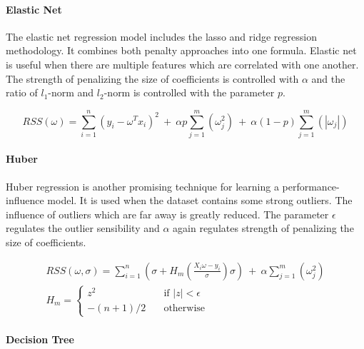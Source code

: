 \paragraph{Elastic Net}

The elastic net regression model includes the lasso and ridge regression methodology. It combines both penalty approaches into one formula. Elastic net is useful when there are multiple features which are correlated with one another. The strength of penalizing the size of coefficients is controlled with $\alpha$ and the ratio of $l_1$-norm and $l_2$-norm is controlled with the parameter $p$.

\begin{equation}
    \label{def:RSS:ElNet}
    RSS(\omega)=\sum_{i=1}^n(y_i-\omega^T x_i)^2\ +\ \alpha p\sum_{j=1}^m(\omega_j^2)\ +\ \alpha(1-p)\sum_{j=1}^m(|\omega_j|)
\end{equation}


\paragraph{Huber}

Huber regression is another promising technique for learning a performance-influence model. It is used when the dataset contains some strong outliers. The influence of outliers which are far away is greatly reduced. The parameter $\epsilon$ regulates the outlier sensibility and $\alpha$ again regulates strength of penalizing the size of coefficients. 

\begin{equation}
    \label{def:RSS:Huber}
    \begin{aligned}
    RSS(\omega,\sigma)=\sum_{i=1}^n(\sigma+H_m(\frac{X_i\omega-y_i}{\sigma})\sigma)\ +\ \alpha\sum_{j=1}^m(\omega_j^2)
    \\
    H_m=\begin{cases}
            z^2       & \quad \text{if } |z| < \epsilon\\
            -(n+1)/2  & \quad \text{otherwise}
        \end{cases}
    \end{aligned}
\end{equation}


\paragraph{Decision Tree}

